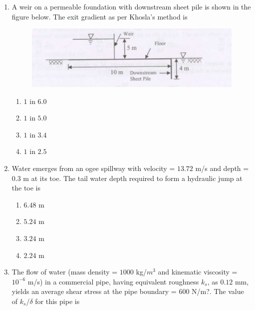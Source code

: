 \documentclass[journal]{IEEEtran}
\begin{document}
\begin{enumerate}
\item A weir on a permeable foundation with downstream sheet pile is shown in the figure below. The exit gradient as per Khosla's method is \textbf{}
\begin{figure}[h]
    \centering
    \includegraphics[width=0.8\columnwidth]{figs/fig4.png} 

\end{figure}
\begin{multicols}{2}

\begin{enumerate}
\item $1$ in $6.0$ 
\item $1$ in $5.0$ 
\item $1$ in $3.4$ 
\item $1$ in $2.5$ 
\end{enumerate}     
\end{multicols}

\item Water emerges from an ogee spillway with velocity = $13.72$ m/s and depth = $0.3$ m at its toe. The tail water depth required to form a hydraulic jump at the toe is \textbf{}

\begin{multicols}{2}

\begin{enumerate}
\item $6.48$ m 
\item $5.24$ m
\item $3.24$ m 
\item $2.24$ m 
\end{enumerate}     
\end{multicols}

\item The flow of water (mass density = $1000$ kg/$m^{3}$ and kinematic viscosity = $10^{-6}$ m/s) in a commercial pipe, having equivalent roughness $k_s$, as $0.12$ mm, yields an average shear stress at the pipe boundary = $600$ N/m?. The value of $k_s$/$\delta$  for this pipe is \textbf{}


\end{enumerate}
\end{document}
